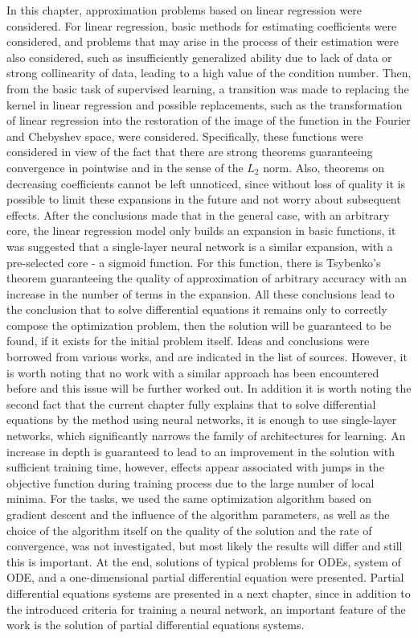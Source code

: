 In this chapter, approximation problems based on linear regression were considered. For linear regression, basic methods for estimating coefficients were considered, and problems that may arise in the process of their estimation were also considered, such as insufficiently generalized ability due to lack of data or strong collinearity of data, leading to a high value of the condition number. Then, from the basic task of supervised learning, a transition was made to replacing the kernel in linear regression and possible replacements, such as the transformation of linear regression into the restoration of the image of the function in the Fourier and Chebyshev space, were considered. Specifically, these functions were considered in view of the fact that there are strong theorems guaranteeing convergence in pointwise and in the sense of the $L_2$ norm. Also, theorems on decreasing coefficients cannot be left unnoticed, since without loss of quality it is possible to limit these expansions in the future and not worry about subsequent effects. After the conclusions made that in the general case, with an arbitrary core, the linear regression model only builds an expansion in basic functions, it was suggested that a single-layer neural network is a similar expansion, with a pre-selected core - a sigmoid function. For this function, there is Tsybenko’s theorem guaranteeing the quality of approximation of arbitrary accuracy with an increase in the number of terms in the expansion. All these conclusions lead to the conclusion that to solve differential equations it remains only to correctly compose the optimization problem, then the solution will be guaranteed to be found, if it exists for the initial problem itself. Ideas and conclusions were borrowed from various works, and are indicated in the list of sources. However, it is worth noting that no work with a similar approach has been encountered before and this issue will be further worked out. In addition it is worth noting the second fact that the current chapter fully explains that to solve differential equations by the method using neural networks, it is enough to use single-layer networks, which significantly narrows the family of architectures for learning. An increase in depth is guaranteed to lead to an improvement in the solution with sufficient training time, however, effects appear associated with jumps in the objective function during training process due to the large number of local minima. For the tasks, we used the same optimization algorithm based on gradient descent and the influence of the algorithm parameters, as well as the choice of the algorithm itself on the quality of the solution and the rate of convergence, was not investigated, but most likely the results will differ and still this is important. At the end, solutions of typical problems for ODEs, system of ODE, and a one-dimensional partial differential equation were presented. Partial differential equations systems are presented in a next  chapter, since in addition to the introduced criteria for training a neural network, an important feature of the work is the solution of partial differential equations systems.
